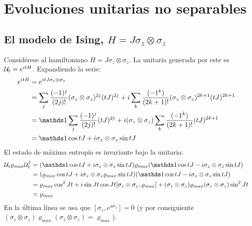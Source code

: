 \section{Evoluciones unitarias no separables}
\subsection{El modelo de Ising, $H=J\sigma_{z}\otimes\sigma_{z}$}\label{sec:Ising}
Considérese al hamiltoniano $H=J\sigma_{z}\otimes\sigma_{z}$. La unitaria generada por este es $\mathcal{U}_{t}=e^{itH}$. Expandiendo la serie:
\begin{align*}
    e^{itH}&=e^{itJ\sigma_{z}\otimes\sigma_{z}}\\
    &=\sum_{j}\frac{(-1)^{j}}{(2j)!}(\sigma_{z}\otimes\sigma_{z})^{2j}(tJ)^{2j}+i\sum_{k}\frac{(-1^{k})}{(2k+1)!}(\sigma_{z}\otimes\sigma_{z})^{2k+1}(tJ)^{2k+1}\\
    &=\Id\sum_{j}\frac{(-1)^{j}}{(2j)!}(tJ)^{2j}+i(\sigma_{z}\otimes\sigma_{z})\sum_{k}\frac{(-1^{k})}{(2k+1)!}(tJ)^{2k+1}\\
    &=\Id \cos{tJ} + i\sigma_{z}\otimes\sigma_{z}\sin{tJ}
\end{align*}
El estado de máxima entropía es invariante bajo la unitaria:
\begin{align*}
    \mcU_{t}\varrho_{max}\mcU_{t}^{\dag}&=(\Id \cos{tJ} + i\sigma_{z}\otimes\sigma_{z}\sin{tJ})\varrho_{max}(\Id \cos{tJ} - i\sigma_{z}\otimes\sigma_{z}\sin{tJ})\\
    &=(\varrho_{max} \cos{tJ} + i\sigma_{z}\otimes\sigma_{z}\varrho_{max}\sin{tJ})(\Id \cos{tJ} - i\sigma_{z}\otimes\sigma_{z}\sin{tJ})\\
    &=\varrho_{max} \cos^{2}{Jt}+i\sin{Jt}\cos{Jt}[\sigma_{z}\otimes\sigma_{z},\varrho_{max}]+(\sigma_{z}\otimes\sigma_{z}) \varrho_{max} (\sigma_{z}\otimes\sigma_{z}) \sin^{2}{Jt}\\
    &=\varrho_{max}
\end{align*}
En la última línea se usa que $[\sigma_{z},e^{a\sigma_{z}}]=0$ (y por consiguiente $(\sigma_{z}\otimes\sigma_{z}) \varrho_{max} (\sigma_{z}\otimes\sigma_{z})=\varrho_{max}$). 